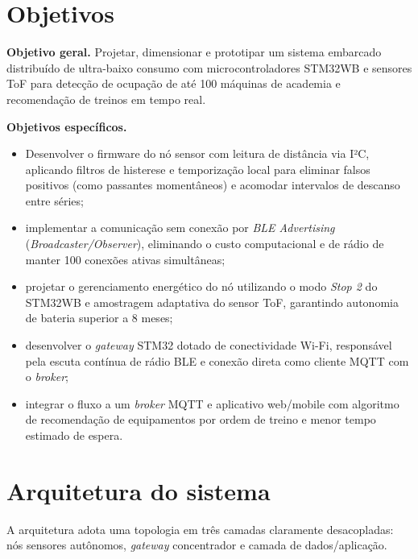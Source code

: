\documentclass[11pt,a4paper]{article}
\begin{document}
\section{Objetivos}

\textbf{Objetivo geral.} Projetar, dimensionar e prototipar um sistema embarcado distribuído
de ultra-baixo consumo com microcontroladores STM32WB e sensores ToF para detecção de
ocupação de até 100 máquinas de academia e recomendação de treinos em tempo real.

\noindent\textbf{Objetivos específicos.}
\begin{itemize}
  \item Desenvolver o firmware do nó sensor com leitura de distância via I²C, aplicando
        filtros de histerese e temporização local para eliminar falsos positivos (como
        passantes momentâneos) e acomodar intervalos de descanso entre séries;
  \item implementar a comunicação sem conexão por \emph{BLE Advertising}
        (\emph{Broadcaster/Observer}), eliminando o custo computacional e de rádio de manter
        100 conexões ativas simultâneas;
  \item projetar o gerenciamento energético do nó utilizando o modo \emph{Stop 2} do
        STM32WB e amostragem adaptativa do sensor ToF, garantindo autonomia de bateria
        superior a 8 meses;
  \item desenvolver o \emph{gateway} STM32 dotado de conectividade Wi-Fi, responsável pela
        escuta contínua de rádio BLE e conexão direta como cliente MQTT com o \emph{broker};
  \item integrar o fluxo a um \emph{broker} MQTT e aplicativo web/mobile com algoritmo de
        recomendação de equipamentos por ordem de treino e menor tempo estimado de espera.
\end{itemize}

\section{Arquitetura do sistema}

A arquitetura adota uma topologia em três camadas claramente desacopladas: nós sensores
autônomos, \emph{gateway} concentrador e camada de dados/aplicação.
\end{document}
